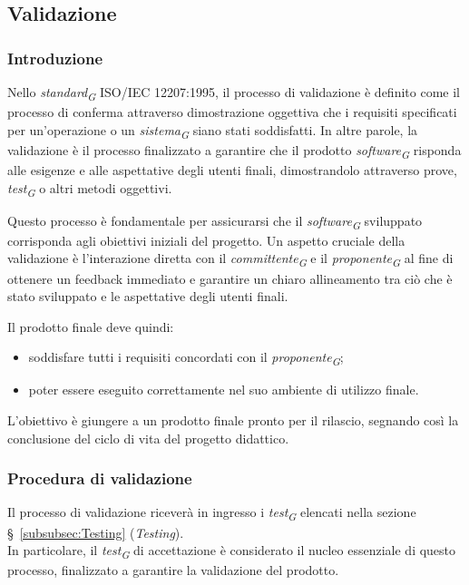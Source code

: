 \subsection{Validazione}
\label{subsec:validazione}

\subsubsection{Introduzione}
Nello \textit{standard}\textsubscript{\textit{G}} ISO/IEC 12207:1995, il processo di validazione è definito come il processo di conferma attraverso dimostrazione oggettiva che i requisiti specificati per un'operazione o un \textit{sistema}\textsubscript{\textit{G}} siano stati soddisfatti. In altre parole, la validazione è il processo finalizzato a garantire che il prodotto \textit{software}\textsubscript{\textit{G}} risponda alle esigenze e alle aspettative degli utenti finali, dimostrandolo attraverso prove, \textit{test}\textsubscript{\textit{G}} o altri metodi oggettivi.

\vspace{0.2cm}

Questo processo è fondamentale per assicurarsi che il \textit{software}\textsubscript{\textit{G}} sviluppato corrisponda agli obiettivi iniziali del progetto. Un aspetto cruciale della validazione è l'interazione diretta con il \textit{committente}\textsubscript{\textit{G}} e il \textit{proponente}\textsubscript{\textit{G}} al fine di ottenere un feedback immediato e garantire un chiaro allineamento tra ciò che è stato sviluppato e le aspettative degli utenti finali.

\vspace{0.2cm}

Il prodotto finale deve quindi: 
\begin{itemize}
    \item 
        soddisfare tutti i requisiti concordati con il \textit{proponente}\textsubscript{\textit{G}}; 
    \item 
        poter essere eseguito correttamente nel suo ambiente di utilizzo finale.
\end{itemize}

L'obiettivo è giungere a un prodotto finale pronto per il rilascio, segnando così la conclusione del ciclo di vita del progetto didattico. 

\subsubsection{Procedura di validazione}
Il processo di validazione riceverà in ingresso i \textit{test}\textsubscript{\textit{G}} elencati nella sezione \S~\ref{subsubsec:Testing} (\textit{Testing}). \\
In particolare, il \textit{test}\textsubscript{\textit{G}} di accettazione è considerato il nucleo essenziale di questo processo, finalizzato a garantire la validazione del prodotto.

